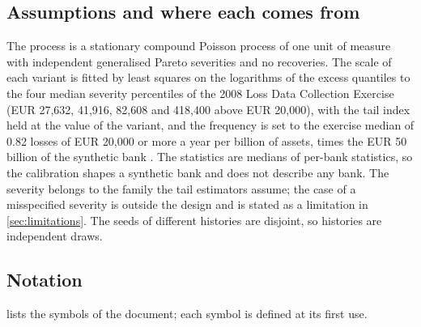 \subsection{Assumptions and where each comes from}
\label{sec:problem-assumptions}

The process is a stationary compound Poisson process of one unit of measure with independent generalised Pareto severities and no recoveries. The scale of each variant is fitted by least squares on the logarithms of the excess quantiles to the four median severity percentiles of the 2008 Loss Data Collection Exercise
(EUR 27,632, 41,916, 82,608 and 418,400 above EUR 20,000), with the tail index held at the value of the variant, and the frequency is set to the exercise median of 0.82 losses of EUR 20,000 or more a year per billion of assets, times the EUR 50 billion of the synthetic bank
\citep{bcbs160}. The statistics are medians of per-bank statistics, so the calibration shapes a synthetic bank and does not describe any bank. The severity belongs to the family the tail estimators assume; the case of a misspecified severity is outside the design and is stated as a limitation in \cref{sec:limitations}.
The seeds of different histories are disjoint, so histories are independent draws.

\subsection{Notation}
\label{sec:problem-notation}

 lists the symbols of the document; each symbol is defined at its first use.

